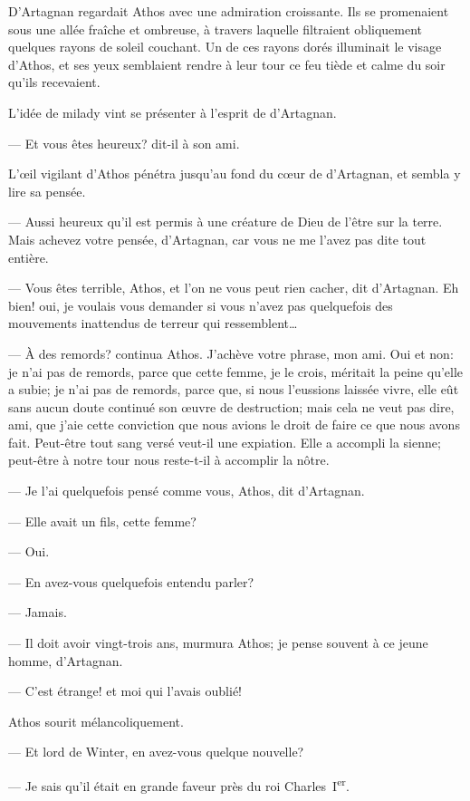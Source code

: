 D'Artagnan regardait Athos avec une admiration croissante. Ils se promenaient sous une allée fraîche et ombreuse, à travers laquelle filtraient obliquement quelques rayons de soleil couchant. Un de ces rayons dorés illuminait le visage d'Athos, et ses yeux semblaient rendre à leur tour ce feu tiède et calme du soir qu'ils recevaient.

L'idée de milady vint se présenter à l'esprit de d'Artagnan.

— Et vous êtes heureux? dit-il à son ami.

L'œil vigilant d'Athos pénétra jusqu'au fond du cœur de d'Artagnan, et sembla y lire sa pensée.

— Aussi heureux qu'il est permis à une créature de Dieu de l'être sur la terre. Mais achevez votre pensée, d'Artagnan, car vous ne me l'avez pas dite tout entière.

— Vous êtes terrible, Athos, et l'on ne vous peut rien cacher, dit d'Artagnan. Eh bien! oui, je voulais vous demander si vous n'avez pas quelquefois des mouvements inattendus de terreur qui ressemblent\dots

— À des remords? continua Athos. J'achève votre phrase, mon ami. Oui et non: je n'ai pas de remords, parce que cette femme, je le crois, méritait la peine qu'elle a subie; je n'ai pas de remords, parce que, si nous l'eussions laissée vivre, elle eût sans aucun doute continué son œuvre de destruction; mais cela ne veut pas dire, ami, que j'aie cette conviction que nous avions le droit de faire ce que nous avons fait. Peut-être tout sang versé veut-il une expiation. Elle a accompli la sienne; peut-être à notre tour nous reste-t-il à accomplir la nôtre.

— Je l'ai quelquefois pensé comme vous, Athos, dit d'Artagnan.

— Elle avait un fils, cette femme?

— Oui.

— En avez-vous quelquefois entendu parler?

— Jamais.

— Il doit avoir vingt-trois ans, murmura Athos; je pense souvent à ce jeune homme, d'Artagnan.

— C'est étrange! et moi qui l'avais oublié!

Athos sourit mélancoliquement.

— Et lord de Winter, en avez-vous quelque nouvelle?

— Je sais qu'il était en grande faveur près du roi Charles~I\textsuperscript{er}.


